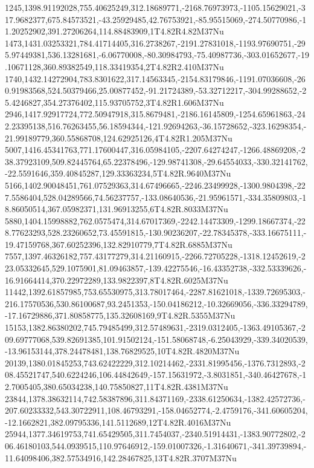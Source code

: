 1245,1398.91192028,755.40625249,312.18689771,-2168.76973973,-1105.15629021,-317.9682377,675.84573521,-43.25929485,42.76753921,-85.95515069,-274.50770986,-11.20252902,391.27206264,114.88483909,1T4.82R4.82M37Nu
1473,1431.03253321,784.41714405,316.2738267,-2191.27831018,-1193.97690751,-295.97449381,536.13281681,-6.06770008,-80.30984793,-75.40987736,-303.01652677,-19.10671128,360.89382549,118.33419354,2T4.82R2.410M37Nu
1740,1432.14272904,783.8301622,317.14563345,-2154.83179846,-1191.07036608,-260.91983568,524.50379466,25.00877452,-91.21724389,-53.32712217,-304.99288652,-25.4246827,354.27376402,115.93705752,3T4.82R1.606M37Nu
2946,1417.92917724,772.50947918,315.8679481,-2186.16145809,-1254.65961863,-242.23395138,516.76263455,56.18594344,-121.92694263,-36.15728652,-323.16298354,-21.99189779,360.55868708,124.62925126,4T4.82R1.205M37Nu
5007,1416.45341763,771.17600447,316.05984105,-2207.64274247,-1266.48869208,-238.37923109,509.82445764,65.22378496,-129.98741308,-29.64554033,-330.32141762,-22.5591646,359.40845287,129.33363234,5T4.82R.9640M37Nu
5166,1402.90048451,761.07529363,314.67496665,-2246.23499928,-1300.9804398,-227.5586404,528.04289566,74.56237757,-133.08640536,-21.95961571,-334.35809803,-18.86050514,367.05982371,131.96913255,6T4.82R.8033M37Nu
5880,1404.15998882,762.0575474,314.67017369,-2242.14473309,-1299.18667374,-228.77623293,528.23260652,73.45591815,-130.90236207,-22.78345378,-333.16675111,-19.47159768,367.60252396,132.82910779,7T4.82R.6885M37Nu
7557,1397.46326182,757.43177279,314.21160915,-2266.72705228,-1318.12452619,-223.05332645,529.1075901,81.09463857,-139.42275546,-16.43352738,-332.53339626,-16.91664414,370.22972289,133.9822397,8T4.82R.6025M37Nu
11442,1392.61857985,753.65530975,313.78017464,-2287.81621018,-1339.72695303,-216.17570536,530.86100687,93.2451353,-150.04186212,-10.32669056,-336.33294789,-17.16729886,371.80858775,135.32608169,9T4.82R.5355M37Nu
15153,1382.86380202,745.79485499,312.57489631,-2319.0312405,-1363.49105367,-209.69777068,539.82691385,101.91502124,-151.58068748,-6.25043929,-339.34020539,-13.96153144,378.24478481,138.76829525,10T4.82R.4820M37Nu
20139,1380.01845253,743.62422229,312.10214462,-2331.81995456,-1376.7312893,-208.45521747,540.6224246,106.44842649,-157.15631972,-3.8031851,-340.46427678,-12.7005405,380.65034238,140.75850827,11T4.82R.4381M37Nu
23844,1378.38632114,742.58387896,311.84371169,-2338.61250634,-1382.42572736,-207.60233332,543.30722911,108.46793291,-158.04652774,-2.4759176,-341.60605204,-12.1662821,382.09795336,141.5112689,12T4.82R.4016M37Nu
25944,1377.34619753,741.65429505,311.7454037,-2340.51914431,-1383.90772802,-206.46180103,544.0939515,110.97646912,-159.01007326,-1.31640671,-341.39739894,-11.64098406,382.57534916,142.28467825,13T4.82R.3707M37Nu
